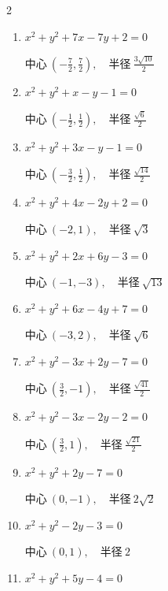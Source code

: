 \begin{multicols}{2}
\begin{enumerate}
  \item $x^{2}+y^{2}+7x-7y+2=0$

        $\displaystyle 中心\: \left(-\frac{7}{2},\frac{7}{2}\right), \quad 半径 \ \frac{3\sqrt{10}}{2}$

  \item $x^{2}+y^{2}+x-y-1=0$

        $\displaystyle 中心\: \left(-\frac{1}{2},\frac{1}{2}\right), \quad 半径 \ \frac{\sqrt{6}}{2}$

  \item $x^{2}+y^{2}+3x-y-1=0$

        $\displaystyle 中心\: \left(-\frac{3}{2},\frac{1}{2}\right), \quad 半径 \ \frac{\sqrt{14}}{2}$

  \item $x^{2}+y^{2}+4x-2y+2=0$

        $\displaystyle 中心\: \left(-2,1\right), \quad 半径 \ \sqrt{3}$

  \item $x^{2}+y^{2}+2x+6y-3=0$

        $\displaystyle 中心\: \left(-1,-3\right), \quad 半径 \ \sqrt{13}$

  \item $x^{2}+y^{2}+6x-4y+7=0$

        $\displaystyle 中心\: \left(-3,2\right), \quad 半径 \ \sqrt{6}$

  \item $x^{2}+y^{2}-3x+2y-7=0$

        $\displaystyle 中心\: \left(\frac{3}{2},-1\right), \quad 半径 \ \frac{\sqrt{41}}{2}$

\columnbreak %

\resetques

  \item $x^{2}+y^{2}-3x-2y-2=0$

        $\displaystyle 中心\: \left(\frac{3}{2},1\right), \quad 半径 \ \frac{\sqrt{21}}{2}$

  \item $x^{2}+y^{2}+2y-7=0$

        $\displaystyle 中心\: \left(0,-1\right), \quad 半径 \ 2\sqrt{2}$

  \item $x^{2}+y^{2}-2y-3=0$

        $\displaystyle 中心\: \left(0,1\right), \quad 半径 \ 2$

  \item $x^{2}+y^{2}+5y-4=0$


\end{enumerate}
\end{multicols}
